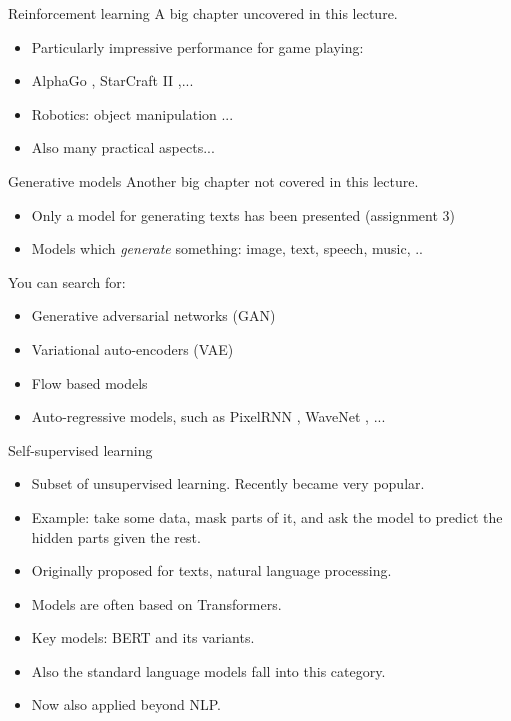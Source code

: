 \begin{frame}{Reinforcement learning}
	A big chapter uncovered in this lecture.\\
 \begin{itemize}
\item Particularly impressive performance for game playing:
\item AlphaGo , StarCraft II ,...
\item Robotics: object manipulation ...
\item Also many practical aspects...
\end{itemize}
\end{frame}

\begin{frame}{Generative models}
Another big chapter not covered in this lecture.
\begin{itemize}
\item Only a model for generating texts has been presented (assignment 3)
\item Models which \textit{generate} something: image, text, speech, music, ..
\end{itemize}
\vsp
You can search for:
\begin{itemize}
\item Generative adversarial networks (GAN) 
\item Variational auto-encoders (VAE) 
\item Flow based models 
\item Auto-regressive models, such as PixelRNN , WaveNet , ...
\end{itemize}
\end{frame}

\begin{frame}{Self-supervised learning}
	\begin{itemize}
        \item Subset of unsupervised learning. Recently became very popular.
        \item Example: take some data, mask parts of it, and ask the model to predict the hidden parts given the rest.
		\item Originally proposed for texts, natural language processing. 
		\item Models are often based on Transformers.
		\item Key models: BERT  and its variants.
\item Also the standard language models fall into this category.
        \item Now also applied beyond NLP.
	\end{itemize}
\end{frame}

